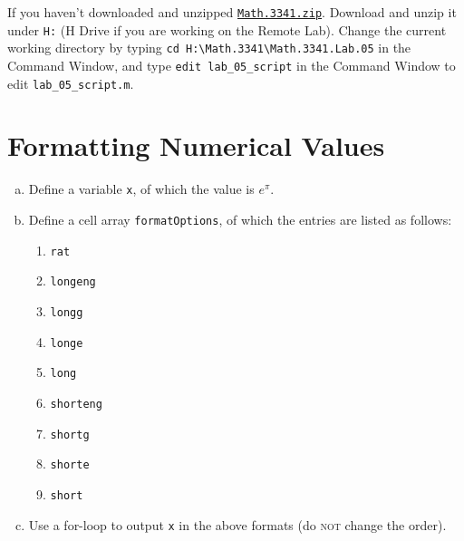 If you haven't downloaded and unzipped \href{https://libaoj.in/courses/2021f/MATH3341/zip/Math.3341.zip}{\texttt{Math.3341.zip}}. Download and unzip it under \verb|H:| (H Drive if you are working on the Remote Lab). Change the current working directory by typing \verb|cd H:\Math.3341\Math.3341.Lab.05| in the Command Window, and type \verb|edit lab_05_script| in the Command Window to edit \verb|lab_05_script.m|.

\section{Formatting Numerical Values}
\begin{enumerate}[(a)]
    \item Define a variable \verb|x|, of which the value is $e^{\pi}$.
    \item Define a cell array \verb|formatOptions|, of which the entries are listed as follows:
        \begin{enumerate}[(1)]
            \item \verb|rat|
            \item \verb|longeng|
            \item \verb|longg|
            \item \verb|longe|
            \item \verb|long|
            \item \verb|shorteng|
            \item \verb|shortg|
            \item \verb|shorte|
            \item \verb|short|
        \end{enumerate}
    \item Use a for-loop to output \verb|x| in the above formats (do \textsc{not} change the order).
\end{enumerate}
